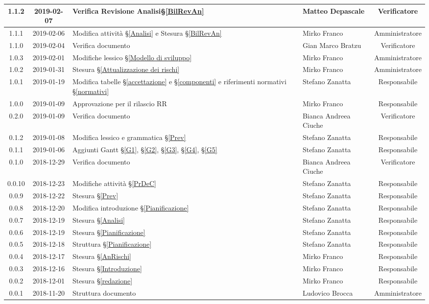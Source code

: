 \begin{center}
\begin{tabularx}{\textwidth}{|c|c|X|X|c|}
			\hline
			1.1.2 & 2019-02-07 & Verifica Revisione Analisi\S\ref{BilRevAn} & Matteo Depascale & Verificatore \\
			\hline
			1.1.1 & 2019-02-06 & Modifica attività \S\ref{Analisi} e Stesura \S\ref{BilRevAn} & Mirko Franco & Amministratore \\
			\hline
			1.1.0 & 2019-02-04 & Verifica documento & Gian Marco Bratzu & Verificatore\\
			\hline
			1.0.3 & 2019-02-01 & Modifiche lessico \S\ref{Modello di sviluppo} & Mirko Franco & Amministratore \\
			\hline
			1.0.2 & 2019-01-31 & Stesura \S\ref{Attualizzazione dei rischi} & Mirko Franco & Amministratore \\
			\hline
			1.0.1 & 2019-01-19 & Modifica tabelle \S\ref{accettazione} e \S\ref{componenti} e riferimenti normativi \S\ref{normativi} & Stefano Zanatta & Responsabile\\
			\hline
			1.0.0 & 2019-01-09 & Approvazione per il rilascio RR & Mirko Franco & Responsabile\\
			\hline
			0.2.0 & 2019-01-09 & Verifica documento & Bianca Andreea Ciuche& Verificatore\\
			\hline
			0.1.2 & 2019-01-08 & Modifica lessico e grammatica \S\ref{Prev}& Stefano Zanatta & Responsabile\\
			\hline
			0.1.1 & 2019-01-06 & Aggiunti Gantt \S\ref{G1}, \S\ref{G2}, \S\ref{G3}, \S\ref{G4}, \S\ref{G5} & Stefano Zanatta & Responsabile\\
			\hline
			0.1.0 & 2018-12-29 & Verifica documento & Bianca Andreea Ciuche& Verificatore\\
			\hline
			0.0.10 & 2018-12-23 & Modifiche attività \S\ref{PrDeC} & Stefano Zanatta & Responsabile\\
			\hline
			0.0.9 & 2018-12-22 & Stesura \S\ref{Prev} & Stefano Zanatta & Responsabile\\
			\hline
			0.0.8 & 2018-12-20 & Modifica introduzione \S\ref{Pianificazione} & Stefano Zanatta & Responsabile\\
			\hline
			0.0.7 & 2018-12-19 & Stesura \S\ref{Analisi}& Stefano Zanatta & Responsabile\\
			\hline
			0.0.6 & 2018-12-19 & Stesura \S\ref{Pianificazione} & Stefano Zanatta & Responsabile\\
			\hline
			0.0.5 & 2018-12-18 & Struttura \S\ref{Pianificazione} & Stefano Zanatta & Responsabile\\
			\hline
			0.0.4 & 2018-12-17 & Stesura \S\ref{AnRischi} & Mirko Franco & Responsabile\\
			\hline
			0.0.3 & 2018-12-16 & Stesura \S\ref{Introduzione} & Mirko Franco& Responsabile\\
			\hline
			0.0.2 & 2018-12-01 & Stesura \S\ref{redazione} & Mirko Franco& Responsabile\\
			\hline
			0.0.1 & 2018-11-20 & Struttura documento & Ludovico Brocca & Amministratore\\
			\hline

		\end{tabularx}
	\end{center}
\newpage
